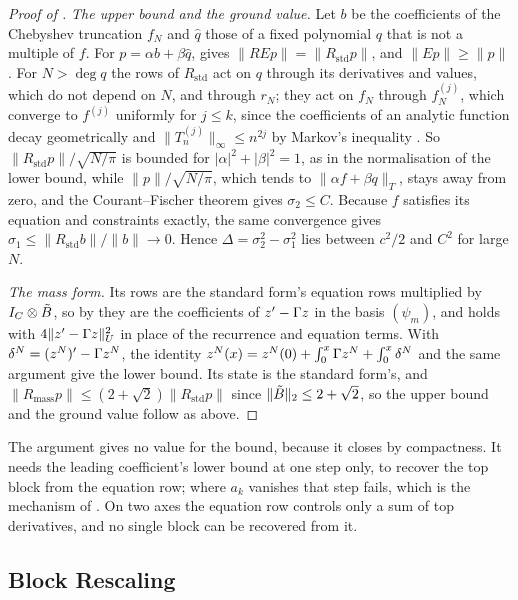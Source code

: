 \begin{proof}[Proof of ]
\emph{The upper bound and the ground value.} Let $b$ be the coefficients of the Chebyshev truncation $f_N$ and $\hat q$ those of a fixed polynomial $q$ that is not a multiple of $f$. For $p=\alpha b+\beta\hat q$,  gives $\|REp\|=\|R_{\mathrm{std}}p\|$, and $\|Ep\|\ge\|p\|$. For $N>\deg q$ the rows of $R_{\mathrm{std}}$ act on $q$ through its derivatives and values, which do not depend on $N$, and through $r_N$; they act on $f_N$ through $f_N^{(j)}$, which converge to $f^{(j)}$ uniformly for $j\le k$, since the coefficients of an analytic function decay geometrically \cite[Ch.~8]{trefethen2013approximation} and $\|T_n^{(j)}\|_\infty\le n^{2j}$ by Markov's inequality \cite{borweinerdelyi1995}. So $\|R_{\mathrm{std}}p\|/\sqrt{N/\pi}$ is bounded for $|\alpha|^2+|\beta|^2=1$, as in the normalisation of the lower bound, while $\|p\|/\sqrt{N/\pi}$, which tends to $\|\alpha f+\beta q\|_T$, stays away from zero, and the Courant--Fischer theorem gives $\sigma_2\le C$. Because $f$ satisfies its equation and constraints exactly, the same convergence gives $\sigma_1\le\|R_{\mathrm{std}}b\|/\|b\|\to0$. Hence $\Delta=\sigma_2^2-\sigma_1^2$ lies between $c^2/2$ and $C^2$ for large $N$.

\emph{The mass form.} Its rows are the standard form's equation rows multiplied by $I_C\otimes\tilde{B}$, so by  they are the coefficients of $z'-\Gamma z$ in the basis $(\psi_m)$, and  holds with $4\|z'-\Gamma z\|_U^2$ in place of the recurrence and equation terms. With $\delta^N=(z^N)'-\Gamma z^N$, the identity $z^N(x)=z^N(0)+\int_0^x\Gamma z^N+\int_0^x\delta^N$ and the same argument give the lower bound. Its state is the standard form's, and $\|R_{\mathrm{mass}}p\|\le(2+\sqrt2)\|R_{\mathrm{std}}p\|$ since $\|\tilde{B}\|_2\le2+\sqrt2$, so the upper bound and the ground value follow as above.
\end{proof}

The argument gives no value for the bound, because it closes by compactness. It needs the leading coefficient's lower bound at one step only, to recover the top block from the equation row; where $a_k$ vanishes that step fails, which is the mechanism of . On two axes the equation row controls only a sum of top derivatives, and no single block can be recovered from it.

\subsection{Block Rescaling}
\label{app:block-rescaling}

